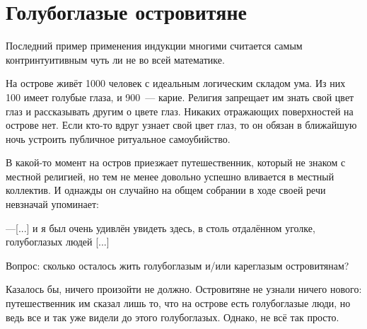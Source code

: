 \section{Голубоглазые островитяне}

Последний пример применения индукции многими считается самым контринтуитивным чуть ли не во всей математике.

\begin{example}
   На острове живёт 1000 человек с идеальным логическим складом ума. Из них 100 имеет голубые глаза, и 900~--- карие. Религия запрещает им знать свой цвет глаз и рассказывать другим о цвете глаз. Никаких отражающих поверхностей на острове нет. Если кто-то вдруг узнает свой цвет глаз, то он обязан в ближайшую ночь устроить публичное ритуальное самоубийство.

    В какой-то момент на остров приезжает путешественник, который не знаком с местной религией, но тем не менее довольно успешно вливается в местный коллектив. И однажды он случайно на общем собрании в ходе своей речи невзначай упоминает:

    ---[...] и я был очень удивлён увидеть здесь, в столь отдалённом уголке, голубоглазых людей [...]

    Вопрос: сколько осталось жить голубоглазым и/или кареглазым островитянам?
\end{example}

Казалось бы, ничего произойти не должно. Островитяне не узнали ничего нового: путешественник им сказал лишь то, что на острове есть голубоглазые люди, но ведь все и так уже видели до этого голубоглазых. Однако, не всё так просто.


